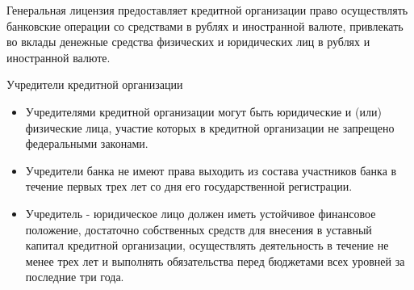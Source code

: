 \documentclass[_Banking_p1.tex]{subfiles}
\begin{document}
\begin{frame}
\begin{block}{Генеральная лицензия}
\quad
предоставляет кредитной организации право осуществлять банковские операции со средствами в рублях и иностранной валюте, привлекать во вклады денежные средства физических и юридических лиц в рублях и иностранной валюте.
\end{block}
\end{frame}
\begin{frame}[shrink=15]{Учредители кредитной организации}
\begin{itemize}
\item
Учредителями кредитной организации могут быть юридические и (или) физические лица, участие которых в кредитной организации не запрещено федеральными законами.
\item
Учредители банка не имеют права выходить из состава участников банка в течение первых трех лет со дня его государственной регистрации.
\item
Учредитель - юридическое лицо должен иметь устойчивое финансовое положение, достаточно собственных средств для внесения в уставный капитал кредитной организации, осуществлять деятельность в течение не менее трех лет и выполнять обязательства перед бюджетами всех уровней за последние три года.
\end{itemize}
\end{frame}
\end{document}
